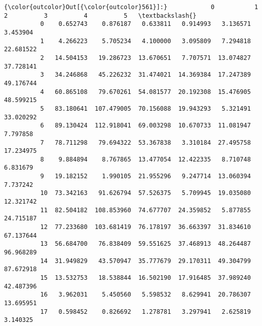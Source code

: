 \documentclass[11pt]{article}
\begin{document}
\begin{Verbatim}[commandchars=\\\{\}]
{\color{outcolor}Out[{\color{outcolor}561}]:}            0           1          2          3          4          5   \textbackslash{}
          0    0.652743    0.876187   0.633811   0.914993   3.136571   3.453904   
          1    4.266223    5.705234   4.100000   3.095809   7.294818  22.681522   
          2   14.504153   19.286723  13.670651   7.707571  13.074827  37.728141   
          3   34.246868   45.226232  31.474021  14.369384  17.247389  49.176744   
          4   60.865108   79.670261  54.081577  20.192308  15.476905  48.599215   
          5   83.180641  107.479005  70.156088  19.943293   5.321491  33.020292   
          6   89.130424  112.918041  69.003298  10.670733  11.081947   7.797858   
          7   78.711298   79.694322  53.367838   3.310184  27.495758  17.234975   
          8    9.884894    8.767865  13.477054  12.422335   8.710748   6.831679   
          9   19.182152    1.990105  21.955296   9.247714  13.060394   7.737242   
          10  73.342163   91.626794  57.526375   5.709945  19.035080  12.321742   
          11  82.504182  108.853960  74.677707  24.359852   5.877855  24.715187   
          12  77.233680  103.681419  76.178197  36.663397  31.834610  67.137644   
          13  56.684700   76.838409  59.551625  37.468913  48.264487  96.968289   
          14  31.949829   43.570947  35.777679  29.170311  49.304799  87.672918   
          15  13.532753   18.538844  16.502190  17.916485  37.989240  42.487396   
          16   3.962031    5.450560   5.598532   8.629941  20.786307  13.695951   
          17   0.598452    0.826692   1.278781   3.297941   2.625819   3.140325   
          

\end{Verbatim}
\end{document}
